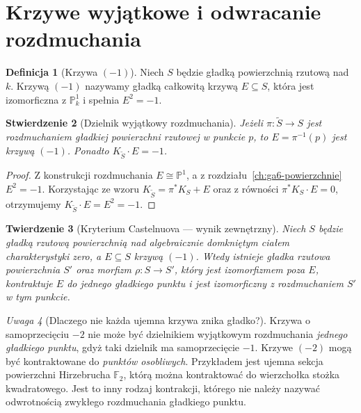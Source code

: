 \documentclass[11pt,a4paper,openany]{report}
\numberwithin{equation}{section}
\theoremstyle{plain}
\newtheorem{twierdzenie}{Twierdzenie}[section]
\newtheorem{stwierdzenie}[twierdzenie]{Stwierdzenie}
\theoremstyle{definition}
\newtheorem{definicja}[twierdzenie]{Definicja}
\theoremstyle{remark}
\newtheorem{uwaga}[twierdzenie]{Uwaga}
\newcommand{\PP}{\mathbb P}
\begin{document}
\section{Krzywe wyjątkowe i odwracanie rozdmuchania}
\label{sec:ga8-contraction}

\begin{definicja}[Krzywa $(-1)$]
\label{def:ga8-minus-one}
Niech $S$ będzie gładką powierzchnią rzutową nad $k$.
Krzywą $(-1)$ nazywamy gładką całkowitą krzywą
$E\subseteq S$, która jest izomorficzna z $\PP^1_k$
i spełnia $E^2=-1$.
\end{definicja}

\begin{stwierdzenie}[Dzielnik wyjątkowy rozdmuchania]
\label{st:ga8-exceptional-curve}
Jeżeli $\pi:\widetilde S\to S$ jest rozdmuchaniem
gładkiej powierzchni rzutowej w punkcie $p$, to
$E=\pi^{-1}(p)$ jest krzywą $(-1)$.
Ponadto $K_{\widetilde S}\cdot E=-1$.
\end{stwierdzenie}
\begin{proof}
Z konstrukcji rozdmuchania $E\cong\PP^1$, a z
rozdziału~\ref{ch:ga6-powierzchnie} $E^2=-1$.
Korzystając ze wzoru $K_{\widetilde S}=\pi^*K_S+E$
oraz z równości $\pi^*K_S\cdot E=0$, otrzymujemy
$K_{\widetilde S}\cdot E=E^2=-1$.
\end{proof}

\begin{twierdzenie}[Kryterium Castelnuova — wynik zewnętrzny]
\label{tw:ga8-castelnuovo}
Niech $S$ będzie gładką rzutową powierzchnią nad
algebraicznie domkniętym ciałem charakterystyki zero,
a $E\subseteq S$ krzywą $(-1)$. Wtedy istnieje
gładka rzutowa powierzchnia $S'$ oraz morfizm
$\rho:S\to S'$, który jest izomorfizmem poza $E$,
kontraktuje $E$ do jednego gładkiego punktu i jest
izomorficzny z rozdmuchaniem $S'$ w tym punkcie.
\end{twierdzenie}

\begin{uwaga}[Dlaczego nie każda ujemna krzywa znika gładko?]
Krzywa o samoprzecięciu $-2$ nie może być dzielnikiem
wyjątkowym rozdmuchania \emph{jednego gładkiego punktu},
gdyż taki dzielnik ma samoprzecięcie $-1$.
Krzywe $(-2)$ mogą być kontraktowane do \emph{punktów osobliwych}.
Przykładem jest ujemna sekcja powierzchni Hirzebrucha
$\mathbb F_2$, którą można kontraktować do wierzchołka
stożka kwadratowego. Jest to inny rodzaj kontrakcji,
którego nie należy nazywać odwrotnością zwykłego
rozdmuchania gładkiego punktu.
\end{uwaga}
\end{document}
